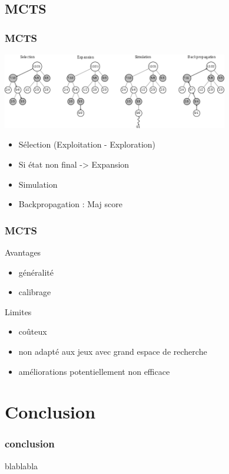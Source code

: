 \documentclass[11pt]{beamer}
\begin{document}
 \subsection{MCTS}
 \begin{frame}
 \frametitle{MCTS}
 \color{blue}
 \vspace{1cm}
 
 \includegraphics[width=280pt]{images/mcts.png}
 \vspace{0.5cm}
 \begin{itemize}
 	\item Sélection (Exploitation - Exploration)
 	\item Si  état non final -> Expansion
 	\item Simulation
 	\item Backpropagation : Maj score
 \end{itemize}
\end{frame}
\begin{frame}
\frametitle{MCTS}
Avantages
\begin{itemize}
\item généralité
\item calibrage
\end{itemize}
Limites
\begin{itemize}
\item      coûteux
\item non adapté aux jeux avec grand espace de recherche
\item améliorations potentiellement non efficace
\end{itemize}

\end{frame}
\section{Conclusion}
\begin{frame}
\frametitle{conclusion}
blablabla
\end{frame}
\end{document}
